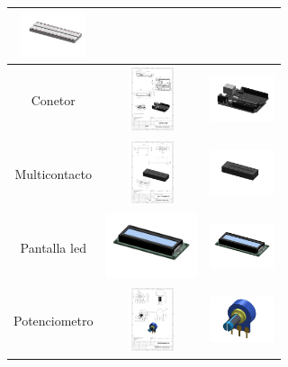 \begin{itemize}
\begin{table} [H]
\begin{tabular}   {| c |  c |  c | }
       \includegraphics[width=19mm]{1/img/Protoboard_1.pdf} \\
        \hline
       Conetor &  \includegraphics[height=19mm]{1/img/Conector.pdf}  & 
       \includegraphics[width=19mm]{1/img/Conector_1.pdf} \\
        \hline
        Multicontacto &  \includegraphics[height=19mm]{1/img/Multicontacto.pdf}  & 
       \includegraphics[width=19mm]{1/img/Multicontacto_1.pdf} \\
        \hline
        Pantalla led & \includegraphics[height=19mm]{1/img/Pantalla Led.pdf}  & 
       \includegraphics[width=19mm]{1/img/Pantalla Led_1.pdf} \\
        \hline
       Potenciometro & \includegraphics[height=19mm]{1/img/Potenciometro.pdf}  & 
       \includegraphics[width=19mm]{1/img/Potenciometro_1.pdf} \\
        \hline
       

\end{tabular}
\end{table}
\end{itemize}
